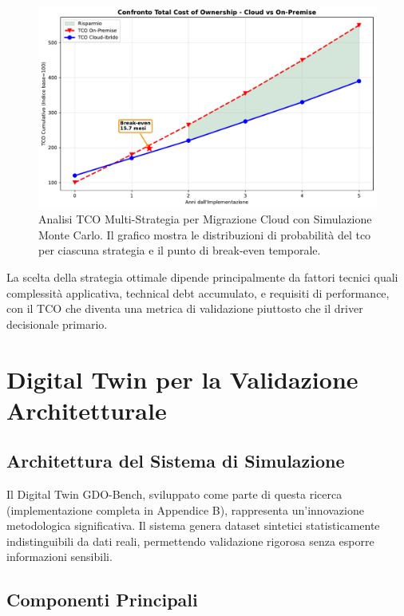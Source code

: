 \begin{figure}[htbp]
\centering
\includegraphics[width=\textwidth]{thesis_figures/cap3/fig_3_4_tco_comparison.pdf}
\caption{Analisi TCO Multi-Strategia per Migrazione Cloud con Simulazione Monte Carlo. Il grafico mostra le distribuzioni di probabilità del \gls{tco} per ciascuna strategia e il punto di break-even temporale.}
\label{fig:cloud_tco}
\end{figure}

La scelta della strategia ottimale dipende principalmente da fattori tecnici quali complessità applicativa, technical debt accumulato, e requisiti di performance, con il TCO che diventa una metrica di validazione piuttosto che il driver decisionale primario.%
\section{\texorpdfstring{Digital Twin per la Validazione Architetturale}{3.4 - Digital Twin per la Validazione Architetturale}}

\subsection{\texorpdfstring{Architettura del Sistema di Simulazione}{3.4.1 - Architettura del Sistema di Simulazione}}

Il Digital Twin GDO-Bench, sviluppato come parte di questa ricerca (implementazione completa in Appendice B), rappresenta un'innovazione metodologica significativa. Il sistema genera dataset sintetici statisticamente indistinguibili da dati reali, permettendo validazione rigorosa senza esporre informazioni sensibili.

\subsection{\texorpdfstring{Componenti Principali}{3.4.2 - Componenti Principali}}

